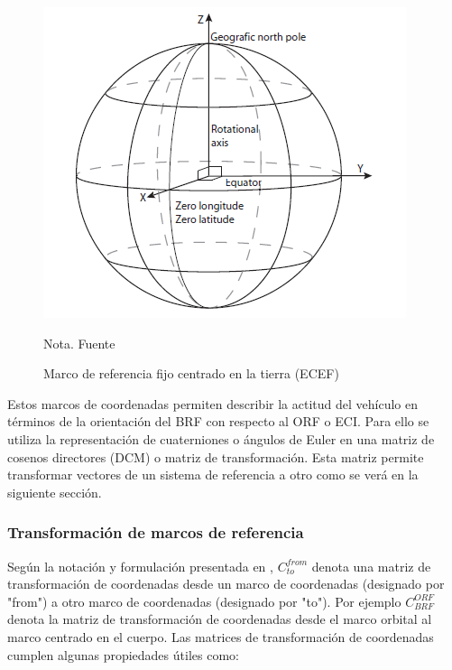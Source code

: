  \begin{figure}[!ht]
	\begin{center}
		\includegraphics[scale=0.7]{imagenes/marco_teorico/ECEF.PNG}\\
	\end{center}
	\caption{ Marco de referencia fijo centrado en la tierra (ECEF)}
	\label{fig:ECEF}
	\footnotesize{Nota. Fuente \cite{Andresen2005}}
\end{figure}

Estos marcos de coordenadas permiten describir la actitud del vehículo en términos de la orientación del BRF con respecto al ORF o ECI. Para ello se utiliza la representación de cuaterniones o ángulos de Euler en una matriz de cosenos directores (DCM) o matriz de transformación. Esta matriz permite transformar vectores de un sistema de referencia a otro como se verá en la siguiente sección.

\subsubsection{Transformación de marcos de referencia}\label{sub_sub:transformada}
\hfill \break
Según la notación y formulación presentada en \cite{grewal2007global},  $C_{to}^{from}$ denota una matriz de transformación de coordenadas desde un
marco de coordenadas (designado por "from") a otro marco de coordenadas (designado por "to"). Por ejemplo $C_{BRF}^{ORF}$ denota la matriz de transformación de coordenadas desde el marco orbital al marco centrado en el cuerpo. Las matrices de transformación de coordenadas cumplen algunas propiedades útiles como:

